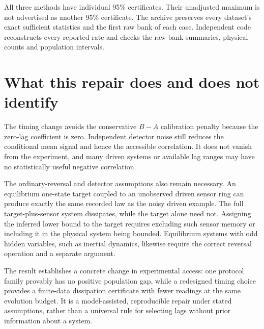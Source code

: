 All three methods have individual 95\% certificates. Their unadjusted maximum
is not advertised as another 95\% certificate. The archive preserves every
dataset's exact sufficient statistics and the first raw bank of each case.
Independent code reconstructs every reported rate and checks the raw-bank
summaries, physical counts and population intervals.

\section{What this repair does and does not identify}
The timing change avoids the conservative $B-A$ calibration penalty because
the zero-lag coefficient is zero. Independent detector noise still reduces
the conditional mean signal and hence the accessible correlation. It does
not vanish from the experiment, and many driven systems or available lag
ranges may have no statistically useful negative correlation.

The ordinary-reversal and detector assumptions also remain necessary. An
equilibrium one-state target coupled to an unobserved driven sensor ring can
produce exactly the same recorded law as the noisy driven example. The full
target-plus-sensor system dissipates, while the target alone need not.
Assigning the inferred lower bound to the target requires excluding such
sensor memory or including it in the physical system being bounded.
Equilibrium systems with odd hidden variables, such as inertial dynamics,
likewise require the correct reversal operation and a separate argument.

The result establishes a concrete change in experimental access: one protocol
family provably has no positive population gap, while a redesigned timing
choice provides a finite-data dissipation certificate with fewer readings at
the same evolution budget. It is a model-assisted, reproducible repair under
stated assumptions, rather than a universal rule for selecting lags without
prior information about a system.
